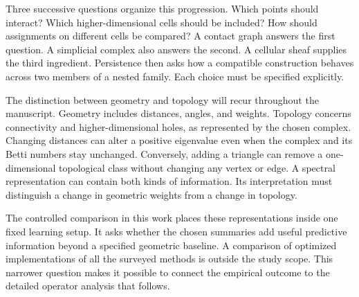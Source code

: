 Three successive questions organize this progression. Which points should interact? Which higher-dimensional cells should be included? How should assignments on different cells be compared? A contact graph answers the first question. A simplicial complex also answers the second. A cellular sheaf supplies the third ingredient. Persistence then asks how a compatible construction behaves across two members of a nested family. Each choice must be specified explicitly.

The distinction between geometry and topology will recur throughout the manuscript. Geometry includes distances, angles, and weights. Topology concerns connectivity and higher-dimensional holes, as represented by the chosen complex. Changing distances can alter a positive eigenvalue even when the complex and its Betti numbers stay unchanged. Conversely, adding a triangle can remove a one-dimensional topological class without changing any vertex or edge. A spectral representation can contain both kinds of information. Its interpretation must distinguish a change in geometric weights from a change in topology.

The controlled comparison in this work places these representations inside one fixed learning setup. It asks whether the chosen summaries add useful predictive information beyond a specified geometric baseline. A comparison of optimized implementations of all the surveyed methods is outside the study scope. This narrower question makes it possible to connect the empirical outcome to the detailed operator analysis that follows.
